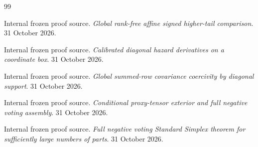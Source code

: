 \begin{thebibliography}{99}

Internal frozen proof source. \emph{Global rank-free affine signed higher-tail comparison}. 31 October 2026.

\par{}

\par{}


Internal frozen proof source. \emph{Calibrated diagonal hazard derivatives on a coordinate box}. 31 October 2026.

\par{}

\par{}


Internal frozen proof source. \emph{Global summed-row covariance coercivity by diagonal support}. 31 October 2026.

\par{}

\par{}


Internal frozen proof source. \emph{Conditional proxy-tensor exterior and full negative voting assembly}. 31 October 2026.

\par{}

\par{}


Internal frozen proof source. \emph{Full negative voting Standard Simplex theorem for sufficiently large numbers of parts}. 31 October 2026.


\end{thebibliography}
